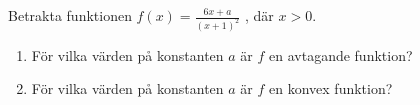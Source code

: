 

Betrakta funktionen $f(x) = \frac{6x+a}{(x+1)^2}$ , där $x>0$.
\begin{enumerate}
\item För vilka värden på konstanten $a$ är $f$ en avtagande funktion?
\item För vilka värden på konstanten $a$ är $f$ en konvex funktion?
\end{enumerate}
